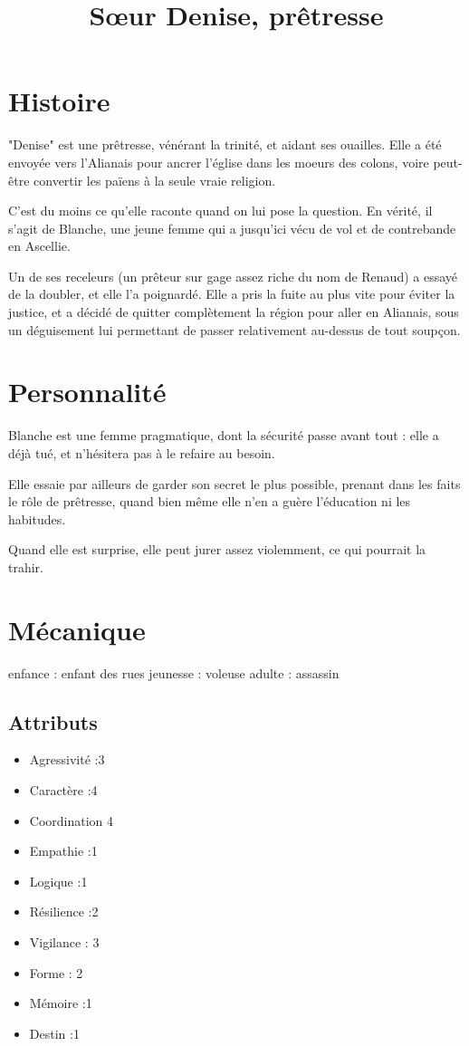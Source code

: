 \documentclass[10pt,a4paper]{article}
\title{Sœur Denise, prêtresse}
\date{}
\begin{document}
\maketitle
\section{Histoire}
"Denise" est une prêtresse, vénérant la trinité, et aidant ses ouailles. Elle a été envoyée vers l'Alianais pour ancrer l'église dans les moeurs des colons, voire peut-être convertir les païens à la seule vraie religion.

C'est du moins ce qu'elle raconte quand on lui pose la question. En vérité, il s'agit de Blanche, une jeune femme qui a jusqu'ici vécu de vol et de contrebande en Ascellie. 

Un de ses receleurs (un prêteur sur gage assez riche du nom de Renaud) a essayé de la doubler, et elle l'a poignardé. Elle a pris la fuite au plus vite pour éviter la justice, et a décidé de quitter complètement la région pour aller en Alianais, sous un déguisement lui permettant de passer relativement au-dessus de tout soupçon.
\section{Personnalité}
Blanche est une femme pragmatique, dont la sécurité passe avant tout : elle a déjà tué, et n'hésitera pas à le refaire au besoin. 

Elle essaie par ailleurs de garder son secret le plus possible, prenant dans les faits le rôle de prêtresse, quand bien même elle n'en a guère l'éducation ni les habitudes.

Quand elle est surprise, elle peut jurer assez violemment, ce qui pourrait la trahir.
\section{Mécanique}
enfance : enfant des rues
jeunesse : voleuse
adulte : assassin
\subsection{Attributs}
\begin{itemize}
\item Agressivité :3
\item Caractère :4
\item Coordination 4
\item Empathie :1
\item Logique :1
\item Résilience :2
\item Vigilance : 3
\item Forme : 2
\item Mémoire :1
\item Destin :1
\end{itemize}
\end{document}
